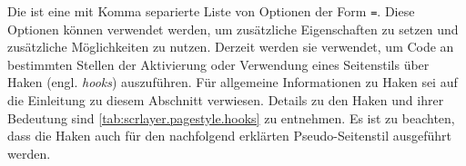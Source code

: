 Die  ist eine mit Komma separierte Liste von Optionen der
Form \texttt{=}. Diese Optionen können verwendet
werden, um zusätzliche Eigenschaften zu setzen und zusätzliche Möglichkeiten
zu nutzen. Derzeit werden sie verwendet, um \mbox{Code} an bestimmten Stellen
der Aktivierung oder Verwendung eines Seitenstils über Haken
(engl. \emph{hooks}) auszuführen. Für allgemeine Informationen zu Haken sei
auf die Einleitung zu diesem Abschnitt verwiesen. Details zu den Haken und
ihrer Bedeutung sind \autoref{tab:scrlayer.pagestyle.hooks} zu entnehmen. Es
ist zu beachten, dass die Haken auch für den nachfolgend erklärten
Pseudo-Seitenstil
%
 ausgeführt werden.

